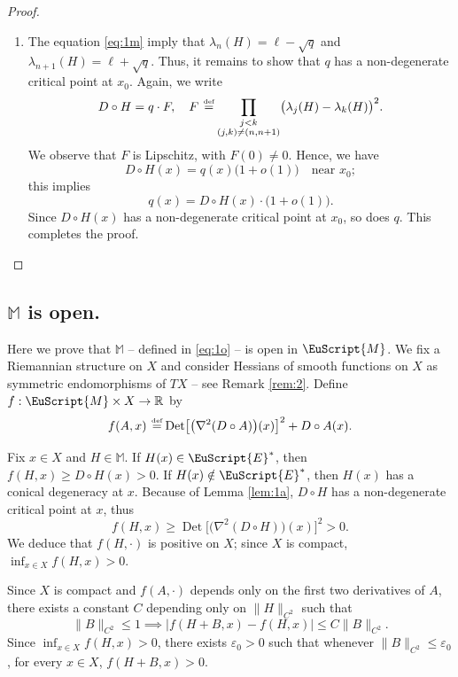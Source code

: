 \documentclass[10pt]{amsart}
\let\pazocal\EuScript
\theoremstyle{definition}
\DeclareMathOperator{\Det}{Det}
\newcommand{\EE}{\pazocal{E}}
\newcommand{\MM}{\pazocal{M}}
\newcommand{\R}{\mathbb{R}}
\newcommand{\Mm}{\mathbb{M}}
\let\epsi\varepsilon
\newcommand{\de}{\,\mathrel{\stackrel{\makebox[0pt]{\mbox{\normalfont\tiny def}}}{=}}}
\begin{document}
\begin{proof}
\begin{enumerate}
\item
The equation \eqref{eq:1m} imply that $\lambda_n(H) = \ell - \sqrt{q}$ and $\lambda_{n+1}(H) = \ell + \sqrt{q}$. Thus, it remains to show that $q$ has a non-degenerate critical point at $x_0$. Again, we write
\begin{equation*}
D \circ H = q \cdot F, \quad F \de \prod_{\substack{j < k \\ (j,k) \neq (n,n+1)}} \bigl(\lambda_j(H)-\lambda_k(H)\bigr)^2.
\end{equation*}
We observe that $F$ is Lipschitz, with $F(0) \neq 0$. Hence, we have
\[
D \circ H(x) = q(x) \bigl(1 + o(1)\bigr)\quad \text{near }x_0;
\]
this implies
\begin{equation*}
q(x) = D \circ H(x) \cdot \bigl( 1 + o(1) \bigr).
\end{equation*}
Since $D \circ H(x)$ has a non-degenerate critical point at $x_0$, so does $q$. This completes the proof.\qedhere
\end{enumerate}
\end{proof}

\subsection{$\Mm$ is open.}\label{sec:2.2} Here we prove that $\Mm$ -- defined in \eqref{eq:1o} -- is open in $\MM$. We fix a Riemannian structure on $X$ and consider Hessians of smooth functions on $X$ as symmetric endomorphisms of $TX$ -- see Remark \ref{rem:2}. Define $f : \MM \times X \to \R$ by
\begin{equation}\label{eq:0j}
f(A,x) \de \Det\bigl[ \bigl(\nabla^2 (D\circ A)\bigr)(x) \bigr]^2 + D \circ A(x).
\end{equation}

Fix $x \in X$ and $H \in \Mm$. If $H(x) \in \EE^*$, then $f(H,x) \geq D \circ H(x) > 0$. If $H(x) \notin \EE^*$, then $H(x)$ has a conical degeneracy at $x$. Because of Lemma \ref{lem:1a}, $D \circ H$ has a non-degenerate critical point at $x$, thus
\begin{equation*}
f(H,x) \geq \Det\bigl[ \bigl(\nabla^2 (D\circ H)\bigr)(x) \bigr]^2 > 0.
\end{equation*}
We deduce that $f(H,\cdot)$ is positive on $X$; since $X$ is compact, $\inf_{x \in X} f(H,x) > 0$.

Since $X$ is compact and $f(A,\cdot)$ depends only on the first two derivatives of $A$, there exists a constant $C$ depending only on $\| H \|_{C^2}$ such that
\begin{equation}\label{eq:0m}
\|B \|_{C^2} \leq 1 \implies
\big|f(H+B,x) - f(H,x)\big| \leq C \|B\|_{C^2}.
\end{equation}
Since $\inf_{x \in X} f(H,x) > 0$, there exists $\epsi_0 > 0$ such that whenever $\| B \|_{C^2} \leq \epsi_0$, for every $x \in X$, $f(H+B,x) > 0$.
\end{document}
